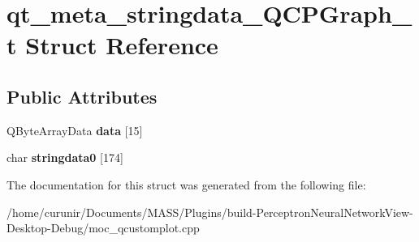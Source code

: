 \hypertarget{structqt__meta__stringdata___q_c_p_graph__t}{}\section{qt\+\_\+meta\+\_\+stringdata\+\_\+\+Q\+C\+P\+Graph\+\_\+t Struct Reference}
\label{structqt__meta__stringdata___q_c_p_graph__t}
\subsection*{Public Attributes}
\begin{DoxyCompactItemize}
\item 
Q\+Byte\+Array\+Data {\bfseries data} \mbox{[}15\mbox{]}\hypertarget{structqt__meta__stringdata___q_c_p_graph__t_a070d55ece907072898e987f8594e5776}{}\label{structqt__meta__stringdata___q_c_p_graph__t_a070d55ece907072898e987f8594e5776}

\item 
char {\bfseries stringdata0} \mbox{[}174\mbox{]}\hypertarget{structqt__meta__stringdata___q_c_p_graph__t_a50b082c96ddea75773a05144ba6d44ca}{}\label{structqt__meta__stringdata___q_c_p_graph__t_a50b082c96ddea75773a05144ba6d44ca}

\end{DoxyCompactItemize}


The documentation for this struct was generated from the following file\+:\begin{DoxyCompactItemize}
\item 
/home/curunir/\+Documents/\+M\+A\+S\+S/\+Plugins/build-\/\+Perceptron\+Neural\+Network\+View-\/\+Desktop-\/\+Debug/moc\+\_\+qcustomplot.\+cpp\end{DoxyCompactItemize}
